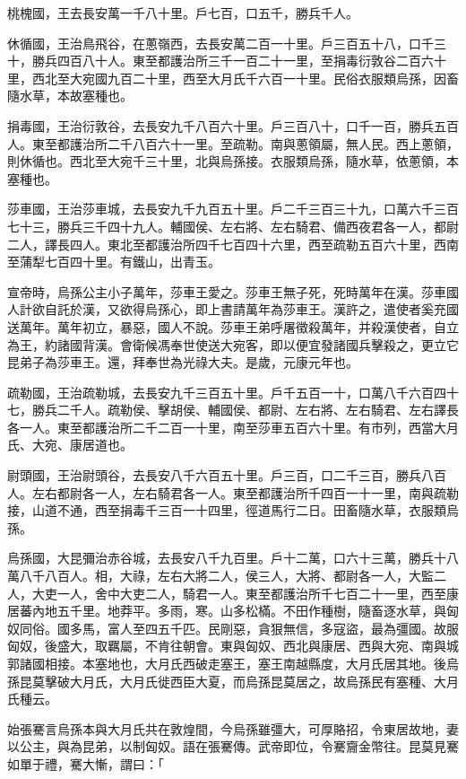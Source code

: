 \begin{pinyinscope}
桃槐國，王去長安萬一千八十里。戶七百，口五千，勝兵千人。

休循國，王治鳥飛谷，在蔥嶺西，去長安萬二百一十里。戶三百五十八，口千三十，勝兵四百八十人。東至都護治所三千一百二十一里，至捐毒衍敦谷二百六十里，西北至大宛國九百二十里，西至大月氏千六百一十里。民俗衣服類烏孫，因畜隨水草，本故塞種也。

捐毒國，王治衍敦谷，去長安九千八百六十里。戶三百八十，口千一百，勝兵五百人。東至都護治所二千八百六十一里。至疏勒。南與蔥領屬，無人民。西上蔥領，則休循也。西北至大宛千三十里，北與烏孫接。衣服類烏孫，隨水草，依蔥領，本塞種也。

莎車國，王治莎車城，去長安九千九百五十里。戶二千三百三十九，口萬六千三百七十三，勝兵三千四十九人。輔國侯、左右將、左右騎君、備西夜君各一人，都尉二人，譯長四人。東北至都護治所四千七百四十六里，西至疏勒五百六十里，西南至蒲犁七百四十里。有鐵山，出青玉。

宣帝時，烏孫公主小子萬年，莎車王愛之。莎車王無子死，死時萬年在漢。莎車國人計欲自託於漢，又欲得烏孫心，即上書請萬年為莎車王。漢許之，遣使者奚充國送萬年。萬年初立，暴惡，國人不說。莎車王弟呼屠徵殺萬年，并殺漢使者，自立為王，約諸國背漢。會衛候馮奉世使送大宛客，即以便宜發諸國兵擊殺之，更立它昆弟子為莎車王。還，拜奉世為光祿大夫。是歲，元康元年也。

疏勒國，王治疏勒城，去長安九千三百五十里。戶千五百一十，口萬八千六百四十七，勝兵二千人。疏勒侯、擊胡侯、輔國侯、都尉、左右將、左右騎君、左右譯長各一人。東至都護治所二千二百一十里，南至莎車五百六十里。有市列，西當大月氏、大宛、康居道也。

尉頭國，王治尉頭谷，去長安八千六百五十里。戶三百，口二千三百，勝兵八百人。左右都尉各一人，左右騎君各一人。東至都護治所千四百一十一里，南與疏勒接，山道不通，西至捐毒千三百一十四里，徑道馬行二日。田畜隨水草，衣服類烏孫。

烏孫國，大昆彌治赤谷城，去長安八千九百里。戶十二萬，口六十三萬，勝兵十八萬八千八百人。相，大祿，左右大將二人，侯三人，大將、都尉各一人，大監二人，大吏一人，舍中大吏二人，騎君一人。東至都護治所千七百二十一里，西至康居蕃內地五千里。地莽平。多雨，寒。山多松樠。不田作種樹，隨畜逐水草，與匈奴同俗。國多馬，富人至四五千匹。民剛惡，貪狠無信，多寇盜，最為彊國。故服匈奴，後盛大，取羈屬，不肯往朝會。東與匈奴、西北與康居、西與大宛、南與城郭諸國相接。本塞地也，大月氏西破走塞王，塞王南越縣度，大月氏居其地。後烏孫昆莫擊破大月氏，大月氏徙西臣大夏，而烏孫昆莫居之，故烏孫民有塞種、大月氏種云。

始張騫言烏孫本與大月氏共在敦煌間，今烏孫雖彊大，可厚賂招，令東居故地，妻以公主，與為昆弟，以制匈奴。語在張騫傳。武帝即位，令騫齎金幣往。昆莫見騫如單于禮，騫大慚，謂曰：「


\end{pinyinscope}
